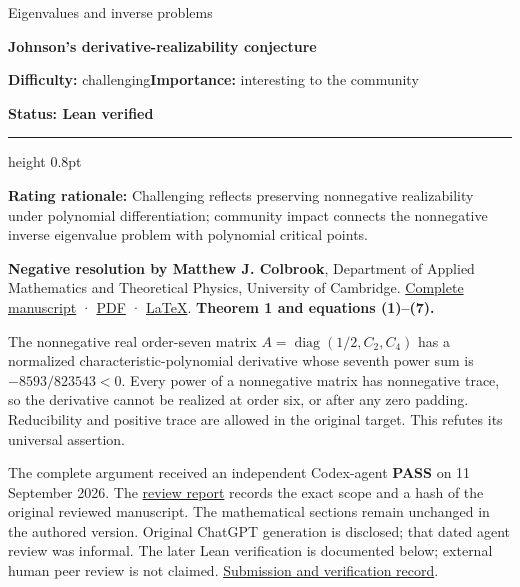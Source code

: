 \documentclass[11pt,a4paper]{article}
\makeatletter
\renewcommand{\subsection}{\Needspace{4\baselineskip}\@startsection{subsection}{2}{0pt}{9pt plus 1pt minus 1pt}{3pt}{\sffamily\bfseries\normalsize\color{ink}}}
\makeatother
\begin{document}
{\sffamily\small\color{muted}Eigenvalues and inverse problems\par}
\vspace{3pt}
{\raggedright{}\sffamily\bfseries\fontsize{21}{24}\selectfont\color{ink}Johnson's
derivative-realizability conjecture\par}
\vspace{7pt}
{\sffamily\small\textbf{Difficulty:} challenging\quad\textbf{Importance:} interesting
to the community\par}
{\sffamily\small\bfseries\color{accent}Status: Lean verified\par}
\vspace{4pt}
{\color{accent}\hrule height 0.8pt}
\vspace{6pt}
\textbf{Rating rationale:} Challenging reflects preserving nonnegative
realizability under polynomial differentiation; community impact
connects the nonnegative inverse eigenvalue problem with polynomial
critical points.

\subsection{Resolution --- 2026-09-11}\label{resolution-2026-09-11}

\textbf{Negative resolution by Matthew J. Colbrook}, Department of
Applied Mathematics and Theoretical Physics, University of Cambridge.
\href{https://github.com/ajt60gaibb/OpenProblemsInNLA/blob/main/eigenvalues-and-inverse-problems/IS-03/solution.md}{Complete
manuscript} ·
\href{https://github.com/ajt60gaibb/OpenProblemsInNLA/blob/main/eigenvalues-and-inverse-problems/IS-03/solution.pdf}{PDF}
·
\href{https://github.com/ajt60gaibb/OpenProblemsInNLA/blob/main/eigenvalues-and-inverse-problems/IS-03/solution.tex}{LaTeX}.
\textbf{Theorem 1 and equations (1)--(7).}

The nonnegative real order-seven matrix
\(A=\mathop{\mathrm{diag}}\nolimits(1/2,C_2,C_4)\) has a normalized
characteristic-polynomial derivative whose seventh power sum is
\(-8593/823543<0\). Every power of a nonnegative matrix has nonnegative
trace, so the derivative cannot be realized at order six, or after any
zero padding. Reducibility and positive trace are allowed in the
original target. This refutes its universal assertion.

The complete argument received an independent Codex-agent \textbf{PASS}
on 11 September 2026. The
\href{https://github.com/ajt60gaibb/OpenProblemsInNLA/blob/main/references/colbrook-additional-2026-09-11/verification/reviews/IS-03-review.md}{review
report} records the exact scope and a hash of the original reviewed
manuscript. The mathematical sections remain unchanged in the authored
version. Original ChatGPT generation is disclosed; that dated agent
review was informal. The later Lean verification is documented below;
external human peer review is not claimed.
\href{https://github.com/ajt60gaibb/OpenProblemsInNLA/blob/main/references/colbrook-additional-2026-09-11/README.md}{Submission
and verification record}.
\end{document}
